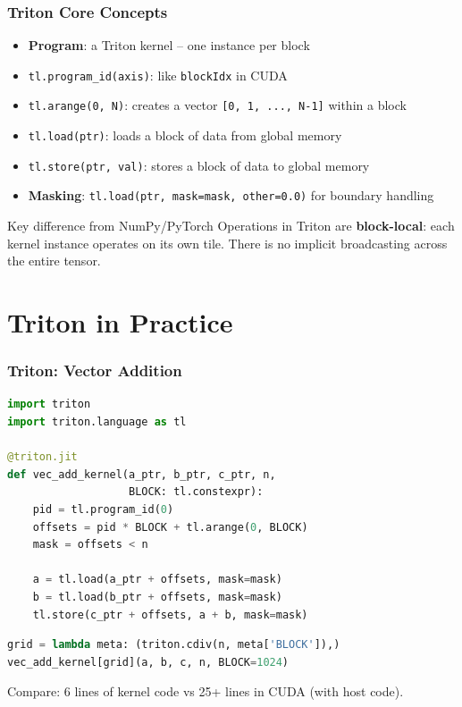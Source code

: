 \documentclass[aspectratio=169]{beamer}
\begin{document}
\begin{frame}
	\frametitle{Triton Core Concepts}
	\begin{itemize}
		\item \textbf{Program}: a Triton kernel -- one instance per block
		\item \texttt{tl.program\_id(axis)}: like \texttt{blockIdx} in CUDA
		\item \texttt{tl.arange(0, N)}: creates a vector \texttt{[0, 1, ..., N-1]} within a block
		\item \texttt{tl.load(ptr)}: loads a block of data from global memory
		\item \texttt{tl.store(ptr, val)}: stores a block of data to global memory
		\item \textbf{Masking}: \texttt{tl.load(ptr, mask=mask, other=0.0)} for boundary handling
	\end{itemize}
	\vspace{0.5em}
	\begin{block}{Key difference from NumPy/PyTorch}
		Operations in Triton are \textbf{block-local}: each kernel instance operates on its own tile.
		There is no implicit broadcasting across the entire tensor.
	\end{block}
\end{frame}

\section{Triton in Practice}

\begin{frame}[fragile]
	\frametitle{Triton: Vector Addition}
	\begin{lstlisting}[language=Python]
import triton
import triton.language as tl

@triton.jit
def vec_add_kernel(a_ptr, b_ptr, c_ptr, n,
                   BLOCK: tl.constexpr):
    pid = tl.program_id(0)
    offsets = pid * BLOCK + tl.arange(0, BLOCK)
    mask = offsets < n

    a = tl.load(a_ptr + offsets, mask=mask)
    b = tl.load(b_ptr + offsets, mask=mask)
    tl.store(c_ptr + offsets, a + b, mask=mask)
	\end{lstlisting}
	\vspace{0.3em}
	\begin{lstlisting}[language=Python, title={\color{codegreen}Launching the kernel}]
grid = lambda meta: (triton.cdiv(n, meta['BLOCK']),)
vec_add_kernel[grid](a, b, c, n, BLOCK=1024)
	\end{lstlisting}
	\vspace{0.3em}
	Compare: 6 lines of kernel code vs 25+ lines in CUDA (with host code).
\end{frame}
\end{document}
